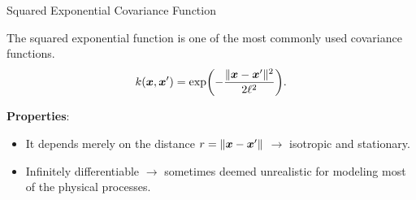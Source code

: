 




\begin{vbframe}{Squared Exponential Covariance Function}

The squared exponential function is one of the most commonly used covariance functions.
$$
k(\bm{x}, \bm{x}^\prime) = \exp\biggl(- \frac{\|\bm{x} - \bm{x}^\prime\|^2}{2\ell^2}\biggr).
$$

\textbf{Properties}:
\begin{itemize}
\item It depends merely on the distance $r = \|\bm{x} - \bm{x}^\prime\|$ $\to$ isotropic and stationary.\lz
\item Infinitely differentiable $\to$ sometimes deemed 
  unrealistic for modeling most of the physical processes.

\end{itemize}

\end{vbframe}


